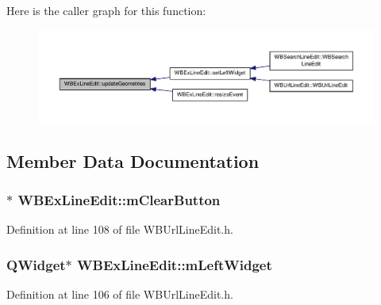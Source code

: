 Here is the caller graph for this function\-:
\nopagebreak
\begin{figure}[H]
\begin{center}
\leavevmode
\includegraphics[width=350pt]{d6/dbb/class_w_b_ex_line_edit_a7798d1c875d908b7efc1d3f987b433fb_icgraph}
\end{center}
\end{figure}




\subsection{Member Data Documentation}
\hypertarget{class_w_b_ex_line_edit_acff3e8a85c6f0b78bf0824b8029ccad2}{
\subsubsection[{m\-Clear\-Button}]{$\ast$ W\-B\-Ex\-Line\-Edit\-::m\-Clear\-Button\hspace{0.3cm}{\ttfamily [protected]}}}\label{d6/dbb/class_w_b_ex_line_edit_acff3e8a85c6f0b78bf0824b8029ccad2}


Definition at line 108 of file W\-B\-Url\-Line\-Edit.\-h.

\hypertarget{class_w_b_ex_line_edit_a39f9e6233d3184edda737d1bea2b356e}{
\subsubsection[{m\-Left\-Widget}]{\setlength{\rightskip}{0pt plus 5cm}Q\-Widget$\ast$ W\-B\-Ex\-Line\-Edit\-::m\-Left\-Widget\hspace{0.3cm}{\ttfamily [protected]}}}\label{d6/dbb/class_w_b_ex_line_edit_a39f9e6233d3184edda737d1bea2b356e}


Definition at line 106 of file W\-B\-Url\-Line\-Edit.\-h.

